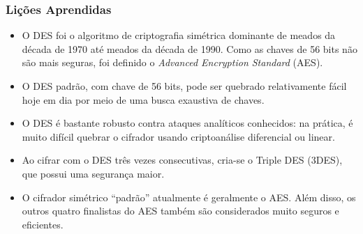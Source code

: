 \documentclass{beamer}
\begin{document}
\begin{frame}
    \frametitle{Lições Aprendidas}

    \begin{itemize}
        \item O DES foi o algoritmo de criptografia simétrica dominante de meados da década de 1970 até meados da década de 1990. Como as chaves de 56 bits não são mais seguras, foi definido o \textit{Advanced Encryption Standard} (AES).
        
        \item O DES padrão, com chave de 56 bits, pode ser quebrado relativamente fácil hoje em dia por meio de uma busca exaustiva de chaves.
        
        \item O DES é bastante robusto contra ataques analíticos conhecidos: na prática, é muito difícil quebrar o cifrador usando criptoanálise diferencial ou linear.
        
        \item Ao cifrar com o DES três vezes consecutivas, cria-se o Triple DES (3DES), que possui uma segurança maior.
        
        \item O cifrador simétrico “padrão” atualmente é geralmente o AES. Além disso, os outros quatro finalistas do AES também são considerados muito seguros e eficientes.
    \end{itemize}
\end{frame}


\end{document}
